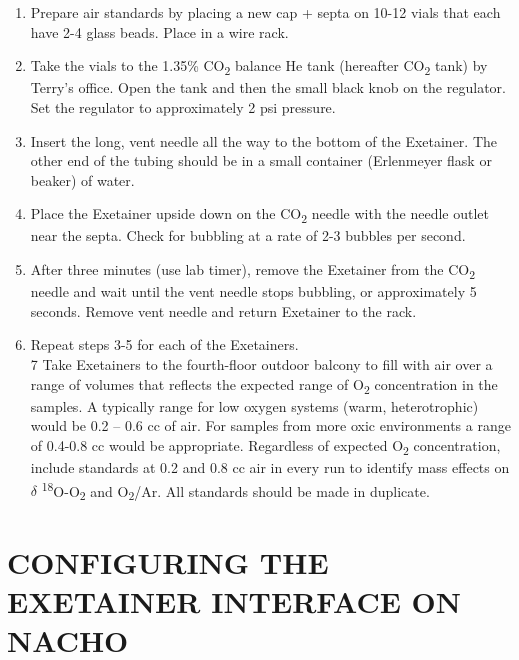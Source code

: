 \documentclass[]{article}
\providecommand{\tightlist}{%
  \setlength{\itemsep}{0pt}\setlength{\parskip}{0pt}}
\begin{document}
\begin{enumerate}
\def\labelenumi{\arabic{enumi}.}
\tightlist
\item
  Prepare air standards by placing a new cap + septa on 10-12 vials that
  each have 2-4 glass beads. Place in a wire rack.\\
\item
  Take the vials to the 1.35\% CO\textsubscript{2} balance He tank
  (hereafter CO\textsubscript{2} tank) by Terry's office. Open the tank
  and then the small black knob on the regulator. Set the regulator to
  approximately 2 psi pressure.\\
\item
  Insert the long, vent needle all the way to the bottom of the
  Exetainer. The other end of the tubing should be in a small container
  (Erlenmeyer flask or beaker) of water.\\
\item
  Place the Exetainer upside down on the CO\textsubscript{2} needle with
  the needle outlet near the septa. Check for bubbling at a rate of 2-3
  bubbles per second.\\
\item
  After three minutes (use lab timer), remove the Exetainer from the
  CO\textsubscript{2} needle and wait until the vent needle stops
  bubbling, or approximately 5 seconds. Remove vent needle and return
  Exetainer to the rack.\\
\item
  Repeat steps 3-5 for each of the Exetainers.\\
  7 Take Exetainers to the fourth-floor outdoor balcony to fill with air
  over a range of volumes that reflects the expected range of
  O\textsubscript{2} concentration in the samples. A typically range for
  low oxygen systems (warm, heterotrophic) would be 0.2 -- 0.6 cc of
  air. For samples from more oxic environments a range of 0.4-0.8 cc
  would be appropriate. Regardless of expected O\textsubscript{2}
  concentration, include standards at 0.2 and 0.8 cc air in every run to
  identify mass effects on \(\delta\)
  \textsuperscript{18}O-O\textsubscript{2} and O\textsubscript{2}/Ar.
  All standards should be made in duplicate.
\end{enumerate}

\section{CONFIGURING THE EXETAINER INTERFACE ON
NACHO}\label{configuring-the-exetainer-interface-on-nacho}
\end{document}
